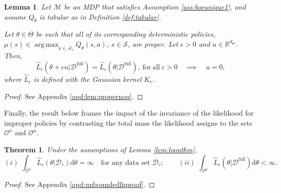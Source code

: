 \documentclass{amsart}
\newtheorem{theorem}{Theorem}[]
\newtheorem{lemma}{Lemma}
\DeclareMathOperator*{\argmax}{arg\,max}
\begin{document}
\begin{lemma}\label{lem:propernou} 
Let $\mathcal{M}$ be an MDP that satisfies Assumption \ref{ass:boeunique1}, and assume $Q_\theta$  is tabular as in Definition \ref{def:tabular}.

\begin{sloppypar}
Let $\theta \in \Theta$ be such that all of its corresponding deterministic policies, $\mu(s)\in\argmax_{a\in \mathcal{A}_s} Q_\theta(s,a)$, $s\in \mathcal{S}$, are proper. Let $\epsilon>0$ and $ u \in \mathbb{R}^{d_\Theta}$. Then,
\[\hat{L}_\epsilon(\theta+cu| \mathcal{D}^{\mathrm{full}}) = \hat{L}_\epsilon(\theta| \mathcal{D}^{\mathrm{full}}), \mathrm{~for~all~} c > 0 
\quad \implies \quad u=0,\]
where $\hat{L}_\epsilon$ is defined with the Gaussian kernel $K_\epsilon$.
\end{sloppypar}
\end{lemma}

\begin{proof}
    See Appendix \ref{apd:lem:propernou}.
\end{proof}

Finally, the result below frames the impact of the invariance of the likelihood for improper policies by contrasting the total mass the likelihood assigns to the sets $\mathcal{O}^\phi$ and $\mathcal{O}^\mu$.

\begin{theorem}\label{thm:unboundedlh}
Under the assumptions of Lemma \ref{lem:loopthm},
$$(i)\,\,\int_{\mathcal{O}^\phi} \hat{L}_\epsilon(\theta|\mathcal{D}_\tau) \mathrm{d} \theta = \infty  \quad \text{for any data set $\mathcal{D}_\tau$};\qquad (ii)\,\,\int_{\mathcal{O}^\mu} \hat{L}_\epsilon(\theta| \mathcal{D}^{\mathrm{full}}) \mathrm{d} \theta < \infty.$$
\end{theorem} 

\begin{proof}
    See Appendix \ref{apd:unboundedlhproof}.
\end{proof}
\end{document}
